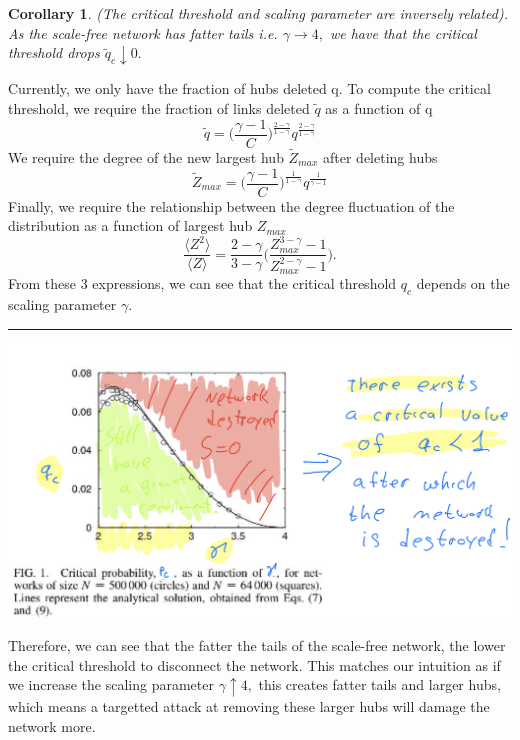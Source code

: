 \documentclass[twoside]{article}
\newtheorem{corollary}[theorem]{Corollary}
\newenvironment{proof}{{\bf Proof:}}{\hfill\rule{2mm}{2mm}}
\begin{document}
\begin{corollary}(The critical threshold and scaling parameter are inversely related). As the scale-free network has fatter tails i.e. $\gamma \rightarrow 4,$ we have that the critical threshold drops $\tilde{q}_c \downarrow 0.$
\end{corollary}

\begin{proof} Currently, we only have the fraction of hubs deleted q. To compute the critical threshold, we require the fraction of links deleted $\tilde{q}$ as a function of q
$$
\tilde{q} = \bigg(\frac{\gamma - 1}{C}\bigg)^{\frac{2 - \gamma}{1 - \gamma}}q^{\frac{2 - \gamma}{1- \gamma}}
$$
We require the degree of the new largest hub $\tilde{Z}_{max}$ after deleting hubs
$$
\tilde{Z}_{max} = \bigg(\frac{\gamma - 1}{C} \bigg)^{\frac{1}{1 - \gamma}}q^{\frac{1}{\gamma - 1}}
$$
Finally, we require the relationship between the degree fluctuation of the distribution as a function of largest hub $Z_{max}$
$$
\frac{\langle Z^2 \rangle}{\langle Z \rangle} = \frac{2 - \gamma}{3 - \gamma}\bigg(\frac{Z_{max}^{3 - \gamma} - 1}{Z_{max}^{2 - \gamma} - 1} \bigg).
$$
From these 3 expressions, we can see that the critical threshold $q_c$ depends on the scaling parameter $\gamma.$
\end{proof}

\begin{center}
\includegraphics[scale=0.4]{Scale-free-hub-removal}
\end{center}

Therefore, we can see that the fatter the tails of the scale-free network, the lower the critical threshold to disconnect the network. This matches our intuition as if we increase the scaling parameter $\gamma \uparrow 4,$ this creates fatter tails and larger hubs, which means a targetted attack at removing these larger hubs will damage the network more.
\end{document}
